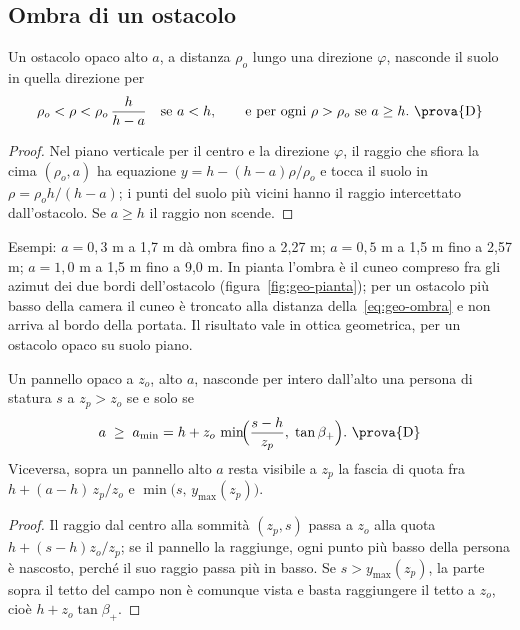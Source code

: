 \subsection{Ombra di un ostacolo}\label{sec:geo-ombra}

\begin{proposizione}\label{prop:geo-ombra}
Un ostacolo opaco alto $a$, a distanza $\rho_o$ lungo una direzione $\varphi$, nasconde il suolo in quella direzione per
\begin{equation}\label{eq:geo-ombra}
\rho_o<\rho<\rho_o\,\frac{h}{h-a}\quad\text{se } a<h,\qquad\text{e per ogni }\rho>\rho_o\ \text{se } a\ge h.\ \text{\prova{D}}
\end{equation}
\end{proposizione}
\begin{proof}
Nel piano verticale per il centro e la direzione $\varphi$, il raggio che sfiora la cima $(\rho_o,a)$ ha equazione $y=h-(h-a)\rho/\rho_o$ e tocca il suolo in $\rho=\rho_o h/(h-a)$; i punti del suolo più vicini hanno il raggio intercettato dall'ostacolo. Se $a\ge h$ il raggio non scende.
\end{proof}

Esempi: $a=0{,}3$ m a 1,7 m dà ombra fino a 2,27 m; $a=0{,}5$ m a 1,5 m fino a 2,57 m; $a=1{,}0$ m a 1,5 m fino a 9,0 m. In pianta l'ombra è il cuneo compreso fra gli azimut dei due bordi dell'ostacolo (figura~\ref{fig:geo-pianta}); per un ostacolo più basso della camera il cuneo è troncato alla distanza della~\eqref{eq:geo-ombra} e non arriva al bordo della portata. Il risultato vale in ottica geometrica, per un ostacolo opaco su suolo piano.

\begin{proposizione}\label{prop:geo-amin}
Un pannello opaco a $z_o$, alto $a$, nasconde per intero dall'alto una persona di statura $s$ a $z_p>z_o$ se e solo se
\begin{equation}\label{eq:geo-amin}
a\;\ge\;a_{\min}=h+z_o\,\min\!\Bigl(\frac{s-h}{z_p},\;\tan\beta_+\Bigr).\ \text{\prova{D}}
\end{equation}
Viceversa, sopra un pannello alto $a$ resta visibile a $z_p$ la fascia di quota fra $h+(a-h)\,z_p/z_o$ e $\min\bigl(s,\,y_{\max}(z_p)\bigr)$.
\end{proposizione}
\begin{proof}
Il raggio dal centro alla sommità $(z_p,s)$ passa a $z_o$ alla quota $h+(s-h)z_o/z_p$; se il pannello la raggiunge, ogni punto più basso della persona è nascosto, perché il suo raggio passa più in basso. Se $s>y_{\max}(z_p)$, la parte sopra il tetto del campo non è comunque vista e basta raggiungere il tetto a $z_o$, cioè $h+z_o\tan\beta_+$.
\end{proof}

